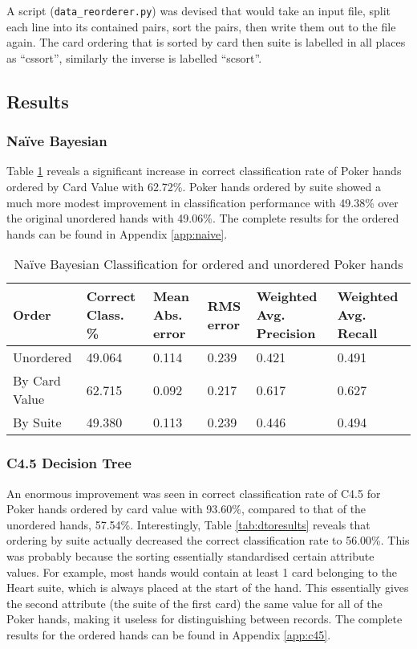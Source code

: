 \documentclass[10pt, a4paper]{article}
\begin{document}
A script (\texttt{data\_reorderer.py}) was devised that would take an input file, split each line into its contained pairs, sort the pairs, then write them out to the file again. The card ordering that is sorted by card then suite is labelled in all places as ``cssort'', similarly the inverse is labelled ``scsort''.

\subsection*{Results}

\subsubsection*{Na\"ive Bayesian}

Table \ref{tab:nboresults} reveals a significant increase in correct classification rate of Poker hands ordered by Card Value with 62.72\%. Poker hands ordered by suite showed a much more modest improvement in classification performance with 49.38\% over the original unordered hands with 49.06\%. The complete results for the ordered hands can be found in Appendix \ref{app:naive}.

\begin{table}[htbp]
  \centering  
    \begin{tabular}{p{3cm}p{1.5cm}p{1.5cm}p{1.5cm}p{1.5cm}p{1.5cm}}
    \toprule
    \textbf{Order} & Correct Class. \% & Mean Abs. error & RMS error & Weighted Avg. Precision & Weighted Avg. Recall \\
    \midrule
    Unordered & 49.064 & 0.114 & 0.239 & 0.421 & 0.491 \\
    By Card Value & 62.715 & 0.092 & 0.217 & 0.617 & 0.627 \\
    By Suite & 49.380 & 0.113 & 0.239 & 0.446 & 0.494 \\
    \bottomrule
    \end{tabular}%
  \caption{Na\"ive Bayesian Classification for ordered and unordered Poker hands}
  \label{tab:nboresults}%
\end{table}%

\subsubsection*{C4.5 Decision Tree}

An enormous improvement was seen in correct classification rate of C4.5 for Poker hands ordered by card value with 93.60\%, compared to that of the unordered hands, 57.54\%. Interestingly, Table \ref{tab:dtoresults} reveals that ordering by suite actually decreased the correct classification rate to 56.00\%. This was probably because the sorting essentially standardised certain attribute values. For example, most hands would contain at least 1 card belonging to the Heart suite, which is always placed at the start of the hand. This essentially gives the second attribute (the suite of the first card) the same value for all of the Poker hands, making it useless for distinguishing between records. The complete results for the ordered hands can be found in Appendix \ref{app:c45}.
\end{document}
